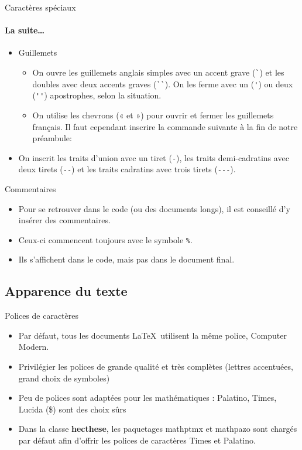 \begin{frame}[fragile]{Caractères spéciaux}
	\framesubtitle{La suite\ldots}
	\begin{itemize}
		\item Guillemets
			\begin{itemize}
				\item On ouvre les guillemets anglais simples avec un accent grave (\lstinline|`|)
					et les doubles avec deux accents graves (\lstinline|``|). On les ferme avec un 
					(\lstinline|'|) ou deux (\lstinline|''|) apostrophes, selon la situation.
				\item On utilise les chevrons (« et ») pour ouvrir et fermer les guillemets français.
					Il faut cependant inscrire la commande suivante à la fin de notre préambule:
\begin{codesource}
\end{codesource}				
			\end{itemize}
		\item On inscrit les traits d'union avec un tiret (\lstinline|-|), les traits demi-cadratins avec deux tirets (\lstinline|--|) et les traits cadratins avec trois tirets (\lstinline|---|).
	\end{itemize}
\end{frame}

\begin{frame}[c]{Commentaires}
\begin{itemize}
\item Pour se retrouver dans le code (ou des documents longs), il est conseillé 
d'y insérer des commentaires.
\item Ceux-ci commencent toujours avec le symbole \texttt{\%}.
\item Ils s'affichent dans le code, mais pas dans le document final.
\end{itemize}
\end{frame}

\subsection{Apparence du texte}

\begin{frame}[c]{Polices de caractères}
	\begin{itemize}
		\item Par défaut, tous les documents \LaTeX\ utilisent la même police, \textrm{Computer Modern}.
		\item Privilégier les polices de grande qualité et très complètes (lettres accentuées, grand choix de symboles)
		\item Peu de polices sont adaptées pour les mathématiques : Palatino, Times, Lucida (\$) sont des choix sûrs
		\item Dans la classe \textbf{hecthese}, les paquetages mathptmx et mathpazo sont chargés par défaut afin	d’offrir les polices de caractères Times et Palatino.
	\end{itemize}
\end{frame}

